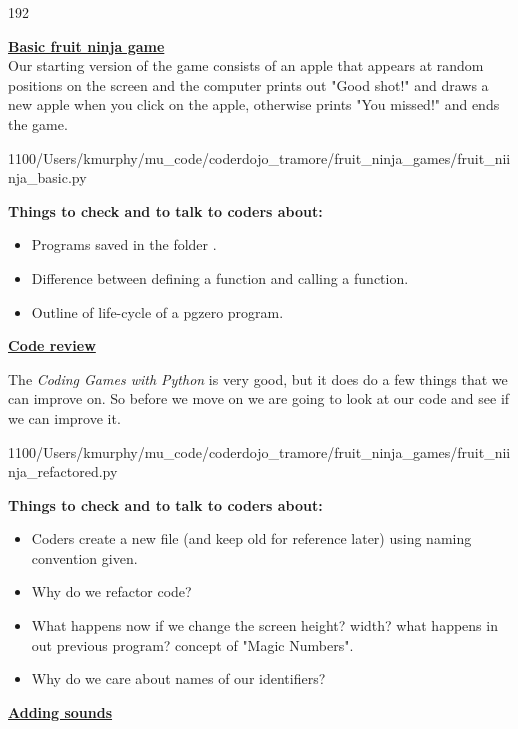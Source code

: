 \documentclass{coderdojo}
\def\MUcode{/Users/kmurphy/mu_code/coderdojo_tramore/fruit_ninja_games/}
\newcommand\contentsitem[2]{
	\item \hyperref[#1]{\color{section}\bfseries #2}
}
\begin{document}
\maketitle

\begin{dingautolist}{192} 


\contentsitem{ball}{Basic fruit ninja game}\\
Our starting version of the game consists of an apple that appears at random positions on the screen and the computer prints out  "Good shot!" and draws a new apple when you click on the apple, otherwise prints "You missed!" and ends the game.

	{1}{100}{\MUcode}{fruit_niinja_basic.py}  

{\bf Things to check and to talk to coders about:}
\begin{itemize}
\item Programs saved in the folder .
\item Difference between defining a function and calling a function.
\item Outline of life-cycle of a pgzero program.
\end{itemize}
\clearpage

\contentsitem{review}{Code review}

The {\em Coding Games with Python} is very good, but it does do a few things that we can improve on. So before we move on we are going to look at our code and see if we can improve it.

	{1}{100}{\MUcode}{fruit_niinja_refactored.py}  

{\bf Things to check and to talk to coders about:}
\begin{itemize}
\item Coders create a new file (and keep old for reference later) using naming convention given.
\item Why do we refactor code? 
\item What happens now if we change the screen height? width? what happens in out previous program? concept of "Magic Numbers".
\item Why do we care about names of our identifiers?
\end{itemize}

\clearpage

\contentsitem{rectangle}{Adding sounds}


\end{dingautolist}
\end{document}
